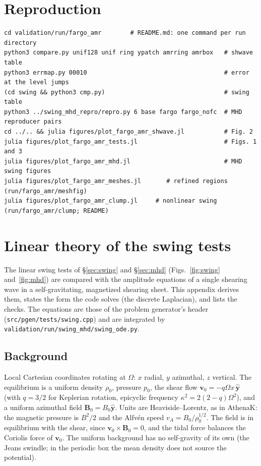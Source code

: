 \documentclass[11pt]{article}
\newcommand{\file}[1]{\texttt{\small #1}}
\newcommand{\Om}{\Omega}
\begin{document}
\section{Reproduction}
\label{sec:repro}
\begin{lstlisting}
cd validation/run/fargo_amr        # README.md: one command per run directory
python3 compare.py unif128 unif ring ypatch amrring amrbox   # shwave table
python3 errmap.py 00010                                      # error at the level jumps
(cd swing && python3 cmp.py)                                 # swing table
python3 ../swing_mhd_repro/repro.py 6 base fargo fargo_nofc  # MHD reproducer pairs
cd ../.. && julia figures/plot_fargo_amr_shwave.jl           # Fig. 2
julia figures/plot_fargo_amr_tests.jl                        # Figs. 1 and 3
julia figures/plot_fargo_amr_mhd.jl                          # MHD swing figures
julia figures/plot_fargo_amr_meshes.jl       # refined regions (run/fargo_amr/meshfig)
julia figures/plot_fargo_amr_clump.jl     # nonlinear swing (run/fargo_amr/clump; README)
\end{lstlisting}


\appendix
\section{Linear theory of the swing tests}
\label{app:theory}
The linear swing tests of \S\ref{sec:swing} and \S\ref{sec:mhd} (Figs.~\ref{fig:swing}
and~\ref{fig:mhd}) are compared with the amplitude equations of a single shearing wave in a
self-gravitating, magnetized shearing sheet. This appendix derives them, states the form
the code solves (the discrete Laplacian), and lists the checks. The equations are those of
the problem generator's header (\file{src/pgen/tests/swing.cpp}) and are integrated by
\file{validation/run/swing\_mhd/swing\_ode.py}.

\subsection{Background}
Local Cartesian coordinates rotating at $\Om$: $x$ radial, $y$ azimuthal, $z$ vertical.
The equilibrium is a uniform density $\rho_0$, pressure $p_0$, the shear flow
$\mathbf v_0 = -q\Om x\,\hat{\mathbf y}$ (with $q = 3/2$ for Keplerian rotation, epicyclic
frequency $\kappa^2 = 2(2-q)\Om^2$), and a uniform azimuthal field
$\mathbf B_0 = B_0\hat{\mathbf y}$. Units are Heaviside--Lorentz, as in AthenaK: the
magnetic pressure is $B^2/2$ and the Alfv\'en speed $v_A = B_0/\rho_0^{1/2}$. The field is
in equilibrium with the shear, since $\mathbf v_0\times\mathbf B_0 = 0$, and the tidal
force balances the Coriolis force of $\mathbf v_0$. The uniform background has no
self-gravity of its own (the Jeans swindle; in the periodic box the mean density does not
source the potential).
\end{document}
